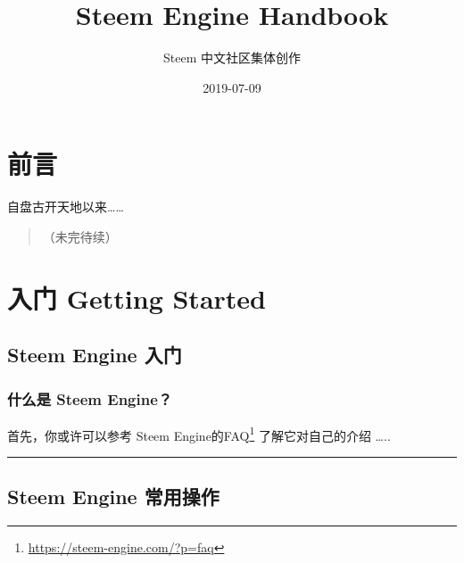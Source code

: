 \documentclass[]{ctexbook}
\title{Steem Engine Handbook}
\author{Steem 中文社区集体创作}
\date{2019-07-09}
\renewcommand{\href}[2]{#2\footnote{\url{#1}}}
\begin{document}

\begin{titlepage}

\end{titlepage}

\setlength{\abovedisplayskip}{-5pt}
\setlength{\abovedisplayshortskip}{-5pt}

{
\setcounter{tocdepth}{1}
\tableofcontents
}


\hypertarget{index}{%
\chapter*{前言}\label{index}}

自盘古开天地以来\ldots{}\ldots{}

\begin{quote}
（未完待续）
\end{quote}

\mainmatter

\hypertarget{start}{%
\chapter{入门 Getting Started}\label{start}}

\hypertarget{se-basics}{%
\section{Steem Engine 入门}\label{se-basics}}

\hypertarget{-steem-engine}{%
\subsection{什么是 Steem Engine？}\label{-steem-engine}}

首先，你或许可以参考 \href{https://steem-engine.com/?p=faq}{Steem Engine的FAQ} 了解它对自己的介绍 \ldots{}..

\begin{center}\rule{0.5\linewidth}{\linethickness}\end{center}

\hypertarget{se-operation}{%
\section{Steem Engine 常用操作}\label{se-operation}}
\end{document}
